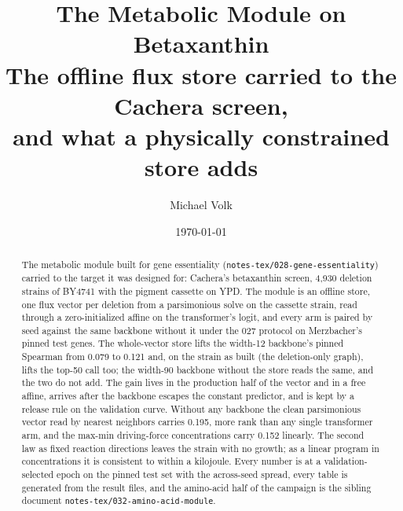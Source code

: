 \documentclass[10pt,a4paper]{article}
\title{\vspace{-1.5em}The Metabolic Module on Betaxanthin\\
  {\large The offline flux store carried to the Cachera screen,\\and what a physically constrained store adds}}
\author{Michael Volk}
\date{\today}
\begin{document}
\maketitle
\thispagestyle{empty}

\begin{abstract}
\noindent
The metabolic module built for gene essentiality (\texttt{notes-tex/028-gene-essentiality})
carried to the target it was designed for: Cachera's betaxanthin screen, 4,930 deletion
strains of BY4741 with the pigment cassette on YPD. The module is an offline store, one
flux vector per deletion from a parsimonious solve on the cassette strain, read through
a zero-initialized affine on the transformer's logit, and every arm is paired by seed
against the same backbone without it under the 027 protocol on Merzbacher's pinned test
genes. The whole-vector store lifts the width-12 backbone's pinned Spearman from 0.079 to
0.121 and, on the strain as built (the deletion-only graph), lifts the top-50 call too;
the width-90 backbone without the store reads the same, and the two do not add. The
gain lives in the production half of the vector and in a free affine, arrives after the
backbone escapes the constant predictor, and is kept by a release rule on the validation
curve. Without any backbone the clean parsimonious vector read by nearest neighbors
carries 0.195, more rank than any single transformer arm, and the max-min driving-force
concentrations carry 0.152 linearly. The second law as fixed reaction directions leaves
the strain with no growth; as a linear program in concentrations it is consistent to
within a kilojoule. Every number is at a validation-selected epoch on the pinned test
set with the across-seed spread, every table is generated from the result files, and
the amino-acid half of the campaign is the sibling document
\texttt{notes-tex/032-amino-acid-module}.
\end{abstract}

\vspace{0.5em}
\tccontents
\clearpage





\end{document}
